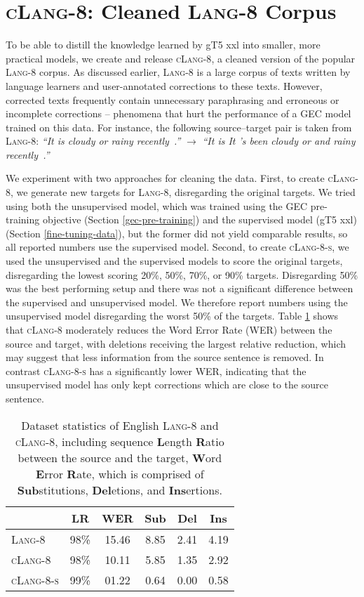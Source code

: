 \documentclass[11pt,a4paper]{article}
\newcommand{\GT}[0]{{gT5}\xspace}
\newcommand{\lang}[0]{{\scshape Lang-8}\xspace}
\newcommand{\clangg}[0]{{\scshape cLang-8}\xspace}
\newcommand{\clangs}[0]{{\scshape cLang-8-s}\xspace}
\begin{document}
\section{\clangg: Cleaned \lang Corpus} \label{lang8}
To be able to distill the knowledge learned by gT5 xxl into smaller, more practical models, we create and release \clangg, a cleaned version of the popular \lang corpus.
As discussed earlier, \lang is a large corpus of texts written by language learners and user-annotated corrections to these texts. 
However, corrected texts frequently contain unnecessary paraphrasing and erroneous or incomplete corrections -- phenomena that hurt the performance of a GEC model trained on this data.
For instance, the following source--target pair is taken from \lang: \textit{``It is cloudy or rainy recently~.''} $\rightarrow$ \textit{``It is It 's been cloudy or and rainy recently~.''}

We experiment with two approaches for cleaning the data. First, to create \clangg, we generate new targets for \lang, disregarding the original targets.
We tried using both the unsupervised model, which was trained using the GEC pre-training objective (Section \ref{gec-pre-training}) and the supervised model (\GT xxl) (Section \ref{fine-tuning-data}), but the former did not yield comparable results, so all reported numbers use the supervised model.
Second, to create \clangs, we used the unsupervised and the supervised models to score the original targets, disregarding the lowest scoring 20\%, 50\%, 70\%, or 90\% targets.
Disregarding 50\% was the best performing setup and there was not a significant difference between the supervised and unsupervised model.
We therefore report numbers using the unsupervised model disregarding the worst 50\% of the targets.
Table \ref{tbl:lang-8-stats} shows that \clangg moderately reduces the Word Error Rate (WER) between the source and target, with deletions receiving the largest relative reduction, which may suggest that less information from the source sentence is removed.
In contrast \clangs has a significantly lower WER, indicating that the unsupervised model has only kept corrections which are close to the source sentence.  

\begin{table}[t]
\footnotesize
\begin{tabularx}{\columnwidth}{Xccccc}
\toprule 
       & LR & WER & Sub  &  Del  &  Ins    \\ \midrule 
\lang &  98\%    &   15.46  &  8.85 & 2.41 & 4.19      \\
 \clangg      & 98\% &  10.11 &  5.85 & 1.35 & 2.92       \\ 
 \clangs & 99\% &01.22 & 0.64& 0.00 & 0.58 \\
 \bottomrule 
\end{tabularx}
\caption{Dataset statistics  of English \lang and \clangg, including sequence \textbf{L}ength \textbf{R}atio between the source and the target, \textbf{W}ord \textbf{E}rror \textbf{R}ate, which is comprised of \textbf{Sub}stitutions, \textbf{Del}etions, and \textbf{Ins}ertions.  }
\label{tbl:lang-8-stats}
\end{table}
\end{document}
